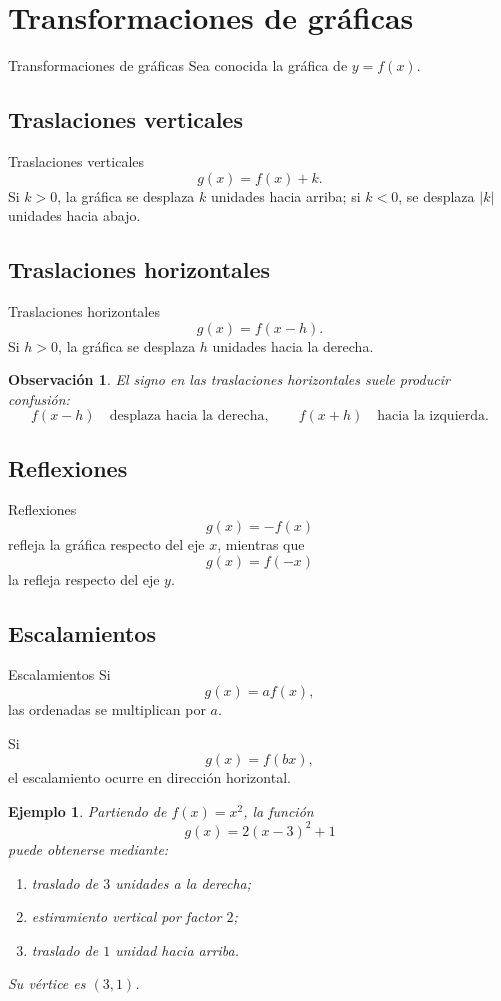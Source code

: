 \documentclass[aspectratio=169,10pt]{beamer}
\newtheorem{observacion}{Observación}
\newtheorem{ejemplo}{Ejemplo}
\begin{document}
\section{Transformaciones de gráficas}
\begin{frame}{Transformaciones de gráficas}
Sea conocida la gráfica de $y=f(x)$.
\end{frame}
\subsection{Traslaciones verticales}
\begin{frame}{Traslaciones verticales}
\[
g(x)=f(x)+k.
\]
Si $k>0$, la gráfica se desplaza $k$ unidades hacia arriba; si $k<0$, se
desplaza $|k|$ unidades hacia abajo.
\end{frame}
\subsection{Traslaciones horizontales}
\begin{frame}{Traslaciones horizontales}
\[
g(x)=f(x-h).
\]
Si $h>0$, la gráfica se desplaza $h$ unidades hacia la derecha.

\begin{observacion}
El signo en las traslaciones horizontales suele producir confusión:
\[
f(x-h)\quad\text{desplaza hacia la derecha},
\qquad
f(x+h)\quad\text{hacia la izquierda}.
\]
\end{observacion}
\end{frame}
\subsection{Reflexiones}
\begin{frame}{Reflexiones}
\[
g(x)=-f(x)
\]
refleja la gráfica respecto del eje $x$, mientras que
\[
g(x)=f(-x)
\]
la refleja respecto del eje $y$.
\end{frame}
\subsection{Escalamientos}
\begin{frame}{Escalamientos}
Si
\[
g(x)=af(x),
\]
las ordenadas se multiplican por $a$.

Si
\[
g(x)=f(bx),
\]
el escalamiento ocurre en dirección horizontal.

\begin{ejemplo}
Partiendo de $f(x)=x^2$, la función
\[
g(x)=2(x-3)^2+1
\]
puede obtenerse mediante:
\begin{enumerate}
    \item traslado de $3$ unidades a la derecha;
    \item estiramiento vertical por factor $2$;
    \item traslado de $1$ unidad hacia arriba.
\end{enumerate}
Su vértice es $(3,1)$.
\end{ejemplo}

\end{frame}
\end{document}
